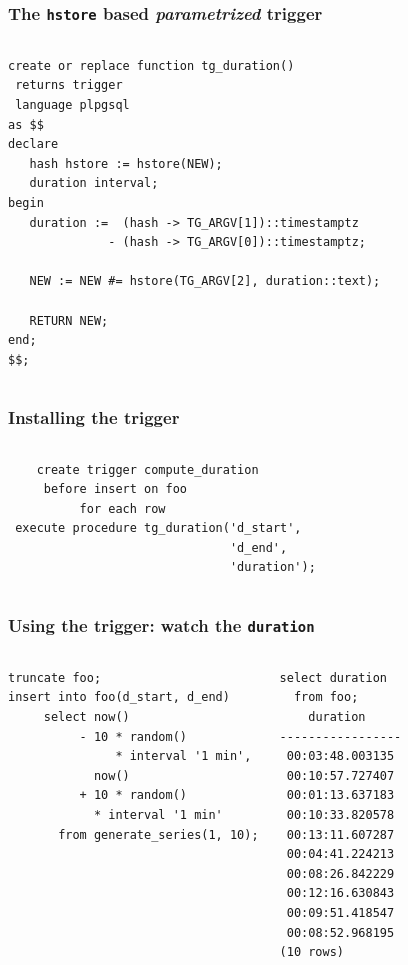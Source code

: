 \documentclass{beamer}
\begin{document}
\begin{frame}[fragile]
  \frametitle{The \texttt{hstore} based \textit{parametrized} trigger}

\begin{columns}
\begin{verbatim}
create or replace function tg_duration()
 returns trigger
 language plpgsql
as $$
declare
   hash hstore := hstore(NEW);
   duration interval;
begin
   duration :=  (hash -> TG_ARGV[1])::timestamptz
              - (hash -> TG_ARGV[0])::timestamptz;

   NEW := NEW #= hstore(TG_ARGV[2], duration::text);

   RETURN NEW;
end;
$$;
\end{verbatim}
\end{columns}
\end{frame}

\begin{frame}[fragile]
  \frametitle{Installing the trigger}

  \vfill

\begin{columns}
\begin{verbatim}
    create trigger compute_duration
     before insert on foo
          for each row
 execute procedure tg_duration('d_start',
                               'd_end',
                               'duration');
\end{verbatim}  
\end{columns}
\end{frame}

\begin{frame}[fragile]
  \frametitle{Using the trigger: watch the \texttt{duration}}

\begin{columns}
\begin{verbatim}
truncate foo;
insert into foo(d_start, d_end)
     select now()
          - 10 * random()
               * interval '1 min',
            now()
          + 10 * random()
            * interval '1 min'
       from generate_series(1, 10);
\end{verbatim}  
\begin{verbatim}
select duration
  from foo;
    duration     
-----------------
 00:03:48.003135
 00:10:57.727407
 00:01:13.637183
 00:10:33.820578
 00:13:11.607287
 00:04:41.224213
 00:08:26.842229
 00:12:16.630843
 00:09:51.418547
 00:08:52.968195
(10 rows)
\end{verbatim}  
\end{columns}
\end{frame}
\end{document}
